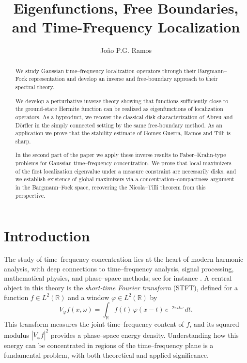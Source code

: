 \documentclass[a4paper,11pt,reqno]{amsart}
\title[Time-frequency localization]{Eigenfunctions, Free Boundaries, and Time-Frequency Localization}
\author{Jo{\~a}o P.G. Ramos}
\numberwithin{equation}{section}
\theoremstyle{plain} %
\theoremstyle{definition} %
\theoremstyle{remark}
\begin{document}
\begin{abstract}
We study Gaussian time--frequency localization operators through their Bargmann--Fock representation and develop an inverse and free-boundary approach to their spectral theory.

We develop a perturbative inverse theory showing that functions sufficiently close to the ground-state Hermite function can be realized as eigenfunctions of localization operators. As a byproduct, we recover the classical disk characterization of Abreu and D\"orfler in the simply connected setting by the same free-boundary method. As an application we prove that the stability estimate of Gomez-Guerra, Ramos and Tilli is sharp.

In the second part of the paper we apply these inverse results to Faber--Krahn-type problems for Gaussian time--frequency concentration. We prove that local maximizers of the first localization eigenvalue under a measure constraint are necessarily disks, and we establish existence of global maximizers via a concentration--compactness argument in the Bargmann--Fock space, recovering the Nicola--Tilli theorem from this perspective.
\end{abstract}
\maketitle 

\section{Introduction}

The study of time--frequency concentration lies at the heart of modern harmonic analysis, with deep connections to time--frequency analysis, signal processing, mathematical physics, and phase--space methods; see for instance \cite{Grochenig,Mallat,Folland}. A central object in this theory is the \emph{short-time Fourier transform} (STFT), defined for a function $f \in L^2(\mathbb{R})$ and a window $\varphi \in L^2(\mathbb{R})$ by
\[
V_\varphi f(x,\omega) = \int_{\mathbb{R}} f(t)\,\varphi(x-t)\,e^{-2\pi i t \omega}\,dt.
\]
This transform measures the joint time--frequency content of $f$, and its squared modulus $|V_\varphi f|^2$ provides a phase--space energy density. Understanding how this energy can be concentrated in regions of the time--frequency plane is a fundamental problem, with both theoretical and applied significance.
\end{document}

